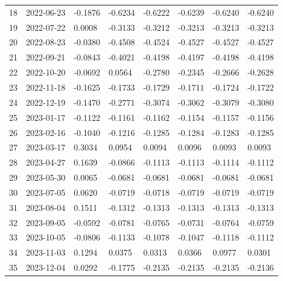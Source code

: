 \begin{footnotesize}
\begin{longtable}{llllllll}
18 & 2022-06-23 & -0.1876 & -0.6234 & -0.6222 & -0.6239 & -0.6240 & -0.6240 \\
19 & 2022-07-22 & 0.0008 & -0.3133 & -0.3212 & -0.3213 & -0.3213 & -0.3213 \\
20 & 2022-08-23 & -0.0380 & -0.4508 & -0.4524 & -0.4527 & -0.4527 & -0.4527 \\
21 & 2022-09-21 & -0.0843 & -0.4021 & -0.4198 & -0.4197 & -0.4198 & -0.4198 \\
22 & 2022-10-20 & -0.0692 & 0.0564 & -0.2780 & -0.2345 & -0.2666 & -0.2628 \\
23 & 2022-11-18 & -0.1625 & -0.1733 & -0.1729 & -0.1711 & -0.1724 & -0.1722 \\
24 & 2022-12-19 & -0.1470 & -0.2771 & -0.3074 & -0.3062 & -0.3079 & -0.3080 \\
25 & 2023-01-17 & -0.1122 & -0.1161 & -0.1162 & -0.1154 & -0.1157 & -0.1156 \\
26 & 2023-02-16 & -0.1040 & -0.1216 & -0.1285 & -0.1284 & -0.1283 & -0.1285 \\
27 & 2023-03-17 & 0.3034 & 0.0954 & 0.0094 & 0.0096 & 0.0093 & 0.0093 \\
28 & 2023-04-27 & 0.1639 & -0.0866 & -0.1113 & -0.1113 & -0.1114 & -0.1112 \\
29 & 2023-05-30 & 0.0065 & -0.0681 & -0.0681 & -0.0681 & -0.0681 & -0.0681 \\
30 & 2023-07-05 & 0.0620 & -0.0719 & -0.0718 & -0.0719 & -0.0719 & -0.0719 \\
31 & 2023-08-04 & 0.1511 & -0.1312 & -0.1313 & -0.1313 & -0.1313 & -0.1313 \\
32 & 2023-09-05 & -0.0592 & -0.0781 & -0.0765 & -0.0731 & -0.0764 & -0.0759 \\
33 & 2023-10-05 & -0.0806 & -0.1133 & -0.1078 & -0.1047 & -0.1118 & -0.1112 \\
34 & 2023-11-03 & 0.1294 & 0.0375 & 0.0313 & 0.0366 & 0.0977 & 0.0301 \\
35 & 2023-12-04 & 0.0292 & -0.1775 & -0.2135 & -0.2135 & -0.2135 & -0.2136 \\
\end{longtable}
\end{footnotesize}
